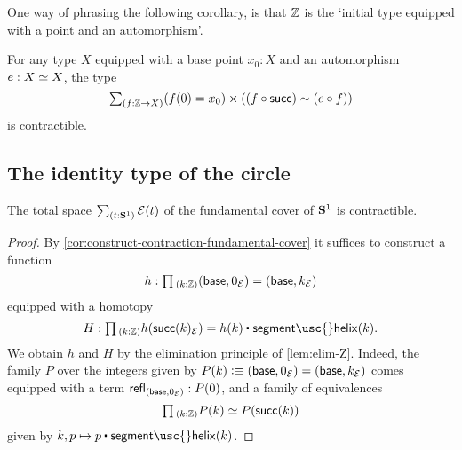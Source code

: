 One way of phrasing the following corollary, is that ${\mathbb{Z}}$ is the `initial type equipped with a point and an automorphism'.

\begin{cor}
  For any type $X$ equipped with a base point $x_0:X$ and an automorphism $e:\eqv{X}{X}$, the type
  \begin{equation*}
    \sm{f:\Z\to X}(f(0)=x_0)\times ((f \circ \mathsf{succ})\htpy(e\circ f))
  \end{equation*}
  is contractible.
\end{cor}



\subsection{The identity type of the circle}

\begin{lem}\label{thm:circle_fundamental}
The total space $\sm{t:\sphere{1}}\mathcal{E}(t)$ of the fundamental cover of $\mathbf{S}^{1}$ is contractible.
\end{lem}

\begin{proof}
  By \cref{cor:construct-contraction-fundamental-cover} it suffices to construct
  a function
  \begin{equation*}
    h : \prd{k:\Z}(\base,0_{\mathcal{E}})=(\base,k_{\mathcal{E}})
  \end{equation*}
  equipped with a homotopy
  \begin{equation*}
    H : \prd{k:\Z}h(\mathsf{succ}(k)_{\mathcal{E}})=\ct{h(k)}{\mathsf{segment\usc{}helix}(k)}.
  \end{equation*}
  We obtain $h$ and $H$ by the elimination principle of \cref{lem:elim-Z}. Indeed, the family $P$ over the integers given by $P(k)\vcentcolon\equiv (\mathsf{base},0_{\mathcal{E}})=(\mathsf{base},k_{\mathcal{E}})$ comes equipped with a term $\mathsf{refl}_{(\mathsf{base},0_{\mathcal{E}})}:P(0)$, and a family of equivalences
  \begin{equation*}
    \prd{k:\Z}P(k) \simeq P(\mathsf{succ}(k))
  \end{equation*}
  given by $k,p\mapsto \ct{p}{\mathsf{segment\usc{}helix}(k)}$. 
\end{proof}

